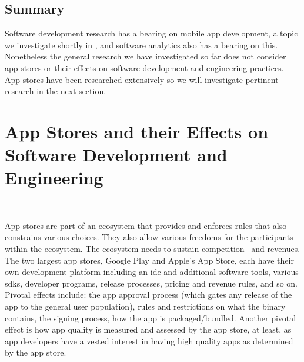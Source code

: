 \subsection{Summary}
Software development research has a bearing on mobile app development, a topic we investigate shortly in , and software analytics also has a bearing on this. Nonetheless the general research we have investigated so far does not consider app stores or their effects on software development and engineering practices. App stores have been researched extensively so we will investigate pertinent research in the next section.



\section{App Stores and their Effects on Software Development and Engineering}~\label{rw-app-stores-and-their-effects-on-software-development-and-engineering}

App stores are part of an ecosystem that provides and enforces rules that also constrains various choices. They also allow various freedoms for the participants within the ecosystem. The ecosystem needs to sustain competition~ and revenues. The two largest app stores, Google Play and Apple's App Store, each have their own development platform including an \Gls{ide} and additional software tools, various \Glspl{sdk}, developer programs, release processes, pricing and revenue rules, and so on. 
Pivotal effects include: the app approval process (which gates any release of the app to the general user population), rules and restrictions on what the binary contains, the signing process, how the app is packaged/bundled. Another pivotal effect is how app quality is measured and assessed by the app store, at least, as app developers have a vested interest in having high quality apps as determined by the app store.

